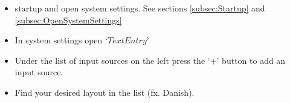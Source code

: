 \documentclass{article}
\begin{document}
\begin{itemize}
\item startup and open system settings. See sections \ref{subsec:Startup} and \ref{subsec:OpenSystemSettings}
\begin{center}
\end{center}
\item In system settings open $‘Text Entry’$
\begin{center}
\end{center}
\item Under the list of input sources on the left press the ‘+’ button to add an input source. 
\item Find your desired layout in the list (fx. Danish). 
\begin{center}

\end{center}
\end{itemize}
\end{document}
